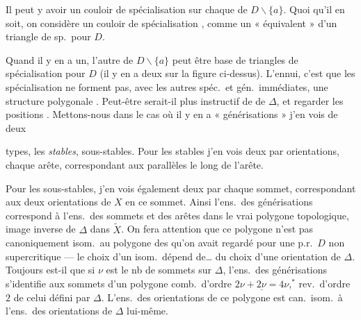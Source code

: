 \documentclass[11pt,a4paper]{article}
\begin{document}
Il peut y avoir un couloir de spécialisation sur chaque  de $D \smallsetminus \lbrace a \rbrace$. Quoi qu'il en soit, on considère  un couloir de spécialisation , comme un « équivalent » \struck{\ill{}} d'un triangle de sp.\ pour $D$.

Quand il y en a un, l'autre  de $D \smallsetminus \lbrace a \rbrace$ peut  \ill{} \struck{\ill{}} être base de triangles de spécialisation pour $D$ (il y en a deux sur la figure ci-dessus). L'ennui, c'est que les   spécialisation ne forment pas, avec les autres spéc.\ et gén.\ immédiates, une structure polygonale .   Peut-être serait-il plus instructif de  de $\Delta$, et regarder les \struck{\ill{}} positions \ill{} \ill{} . Mettons-nous dans le cas où il y en a  \ill{} « générisations »  j'en vois de deux

types, les \emph{stables}, \struck{\ill{}}  sous-stables. Pour les stables j'en vois deux par  orientations, \struck{\ill{}} chaque arête, correspondant aux  \ill{} parallèles le long de l'arête.

Pour les sous-stables, j'en vois également deux par chaque sommet, correspondant aux deux orientations de $X$ en ce sommet. Ainsi l'ens.\ des \struck{\ill{}} générisations correspond à l'ens.\ des sommets et des arêtes dans le vrai polygone topologique, image inverse de $\Delta$ dans $\widetilde{X}$. On fera attention que ce polygone n'est pas \struck{\ill{}} canoniquement isom.\ au polygone des  qu'on avait regardé pour une p.r.\ $D$ non supercritique --- le choix d'un isom.\ dépend de\ldots{} du choix d'une orientation de $\Delta$. Toujours est-il que si $\nu$ est le nb de sommets sur $\Delta$, l'ens.\ des générisations   s'identifie aux sommets d'un \ill{} polygone comb.\ d'ordre $\underline{2\nu + 2\nu = 4\nu}$,$^{*}$ rev.\ d'ordre $2$ de celui défini par $\Delta$. L'ens.\ des orientations de ce polygone est can.\ isom.\ à l'ens.\ des orientations de $\Delta$ lui-même.
\end{document}
